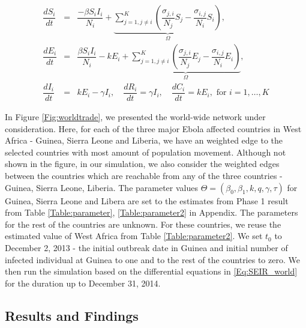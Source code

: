 \documentclass[10pt, journal,onecolumn]{IEEEtran}
\begin{document}
\begin{eqnarray}
\dfrac{dS_{i}}{dt}&=&\dfrac{-\beta S_{i}I_{i}}{N_{i}}+\underset{\Omega}{\underbrace{\sum_{j=1,j\neq i}^{K}\left(\dfrac{\sigma_{j,i}}{N_{j}}S_{j}-\dfrac{\sigma_{i,j}}{N_{i}}S_{i}\right)}},\nonumber \\
\dfrac{dE_{i}}{dt}&=&\dfrac{\beta S_{i}I_{i}}{N_{i}}-kE_{i}+\underset{\Omega}{\underbrace{\sum_{j=1,j\neq i}^{K}\left(\dfrac{\sigma_{j,i}}{N_{j}}E_{j}-\dfrac{\sigma_{i,j}}{N_{i}}E_{i}\right)}},\nonumber \\
\dfrac{dI_{i}}{dt}&=& kE_{i}-\gamma I_{i},
\quad
\dfrac{dR_i}{dt}	=	\gamma I_i,
\quad
\dfrac{dC_i}{dt}	=	kE_i, \text{  for } i=1,\ldots, K
\label{Eq:SEIR_world}
\end{eqnarray}

In Figure \ref{Fig:worldtrade}, we presented the world-wide network under consideration. Here, for each of the three major Ebola affected countries in West Africa - Guinea, Sierra Leone and Liberia, we have an weighted edge to the selected countries with most amount of population movement. Although not shown in the figure, in our simulation, we also consider the weighted edges between the countries which are reachable from any of the three countries -  Guinea, Sierra Leone,  Liberia.  The parameter values $\Theta=(\beta_0,\beta_1,k,q,\gamma, \tau)$ for Guinea, Sierra Leone and Libera are set to the estimates from Phase 1 result from Table \ref{Table:parameter}, \ref{Table:parameter2} in Appendix. The parameters for the rest of the countries are unknown. For these countries, we reuse the estimated value of West Africa from Table \ref{Table:parameter2}. We set $t_0$ to December 2, 2013 - the initial outbreak date in Guinea and initial number of infected individual at Guinea to one and to the rest of the countries to zero. We then run the simulation based on the differential equations in \eqref{Eq:SEIR_world} for the duration up to December 31, 2014.

\subsection{Results and Findings}
\label{SubSec:WorldResult}
\end{document}
